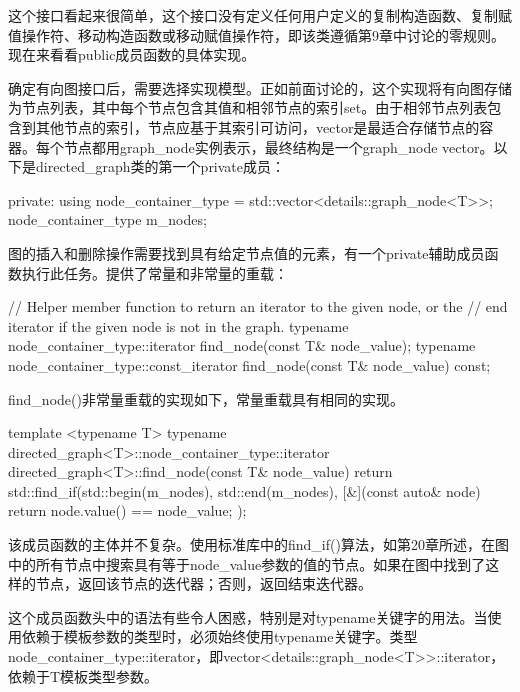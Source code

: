 这个接口看起来很简单，这个接口没有定义任何用户定义的复制构造函数、复制赋值操作符、移动构造函数或移动赋值操作符，即该类遵循第9章中讨论的零规则。现在来看看public成员函数的具体实现。


确定有向图接口后，需要选择实现模型。正如前面讨论的，这个实现将有向图存储为节点列表，其中每个节点包含其值和相邻节点的索引set。由于相邻节点列表包含到其他节点的索引，节点应基于其索引可访问，vector是最适合存储节点的容器。每个节点都用graph\_node实例表示，最终结构是一个graph\_node vector。以下是directed\_graph类的第一个private成员：

\begin{cpp}
private:
    using node_container_type = std::vector<details::graph_node<T>>;
    node_container_type m_nodes;
\end{cpp}


图的插入和删除操作需要找到具有给定节点值的元素，有一个private辅助成员函数执行此任务。提供了常量和非常量的重载：

\begin{cpp}
// Helper member function to return an iterator to the given node, or the
// end iterator if the given node is not in the graph.
typename node_container_type::iterator find_node(const T& node_value);
typename node_container_type::const_iterator find_node(const T& node_value) const;
\end{cpp}

find\_node()非常量重载的实现如下，常量重载具有相同的实现。

\begin{cpp}
template <typename T>
typename directed_graph<T>::node_container_type::iterator
    directed_graph<T>::find_node(const T& node_value)
{
    return std::find_if(std::begin(m_nodes), std::end(m_nodes),
        [&](const auto& node) { return node.value() == node_value; });
}
\end{cpp}

该成员函数的主体并不复杂。使用标准库中的find\_if()算法，如第20章所述，在图中的所有节点中搜索具有等于node\_value参数的值的节点。如果在图中找到了这样的节点，返回该节点的迭代器；否则，返回结束迭代器。

这个成员函数头中的语法有些令人困惑，特别是对typename关键字的用法。当使用依赖于模板参数的类型时，必须始终使用typename关键字。类型node\_container\_type::iterator，即vector<details::graph\_node<T>{}>::iterator，依赖于T模板类型参数。


